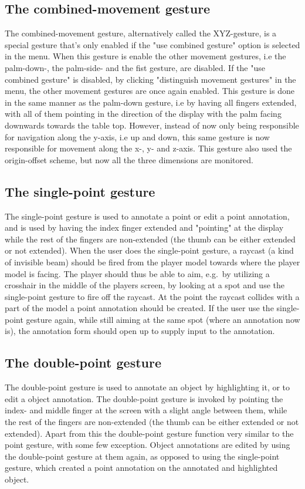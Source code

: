 \subsection{The combined-movement gesture}
\label{sec:combined-movement}
The combined-movement gesture, alternatively called the XYZ-gesture, is a special gesture that's only enabled if the "use combined gesture" option is selected in the menu.
When this gesture is enable the other movement gestures, i.e the palm-down-, the palm-side- and the fist gesture, are disabled. If the "use combined gesture" is disabled, 
by clicking "distinguish movement gestures" in the menu, the other movement gestures are once again enabled. This gesture is done in the same manner as the palm-down gesture, 
i.e by having all fingers extended, with all of them pointing in the direction of the display with the palm facing downwards towards the table top.
However, instead of now only being responsible for navigation along the y-axis, i.e up and down, this same gesture is now responsible for movement along the x-, y- and z-axis.
This gesture also used the origin-offset scheme, but now all the three dimensions are monitored. 

\subsection{The single-point gesture}
The single-point gesture is used to annotate a point or edit a point annotation, and is used by having the index finger extended and "pointing" at the display while the 
rest of the fingers are non-extended (the thumb can be either extended or not extended). 
When the user does the single-point gesture, a raycast (a kind of invisible beam) should be fired from the player model towards where the player model is facing.
The player should thus be able to aim, e.g.~by utilizing a crosshair in the middle of the players screen, by looking at a spot and use the single-point gesture to fire off 
the raycast. At the point the raycast collides with a part of the model a point annotation should be created. If the user use the single-point gesture again, while
still aiming at the same spot (where an annotation now is), the annotation form should open up to supply input to the annotation. 

\subsection{The double-point gesture}
The double-point gesture is used to annotate an object by highlighting it, or to edit a object annotation. The double-point gesture is invoked by pointing the index- and
middle finger at the screen with a slight angle between them, while the rest of the fingers are non-extended (the thumb can be either extended or not extended).
Apart from this the double-point gesture function very similar to the point gesture, with some few exception. Object annotations are edited by using the 
double-point gesture at them again, as opposed to using the single-point gesture, which created a point annotation on the annotated and highlighted object.

